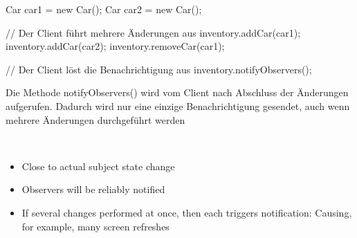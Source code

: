 \begin{enumerate}
\begin{codeBlock}{}
{{                    Car car1 = new Car();
                    Car car2 = new Car();
            
                    // Der Client führt mehrere Änderungen aus
                    inventory.addCar(car1);
                    inventory.addCar(car2);
                    inventory.removeCar(car1);

                    // Der Client löst die Benachrichtigung aus
                    inventory.notifyObservers();
                }
            }
        \end{codeBlock}
        Die Methode notifyObservers() wird vom Client nach Abschluss der Änderungen aufgerufen. Dadurch wird nur eine einzige Benachrichtigung gesendet, auch wenn mehrere Änderungen durchgeführt werden
\end{enumerate}
\begin{defBox}
    \\
    \begin{itemize}
        \item Close to actual subject state change
        \item Observers will be reliably notified
    \end{itemize}
    \begin{itemize}
        \item If several changes performed at once, then each triggers notification: Causing, for example, many screen refreshes
    \end{itemize}
\end{defBox}
